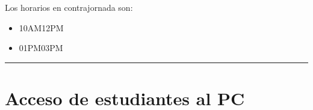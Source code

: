 \documentclass[letterpaper,10pt,spanish]{sphinxmanual}
\begin{document}
\sphinxAtStartPar
Los horarios en contrajornada son:
\begin{itemize}
\item {} 
\sphinxAtStartPar
{} 10AM\sphinxhyphen{}12PM

\item {} 
\sphinxAtStartPar
{} 01PM\sphinxhyphen{}03PM

\end{itemize}


\bigskip\hrule\bigskip



\section{Acceso de estudiantes al PC}
\label{\detokenize{informacion:acceso-de-estudiantes-al-pc}}
\end{document}
